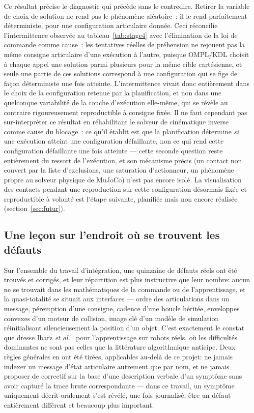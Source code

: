 \documentclass[a4paper, oneside]{article}
\begin{document}
Ce résultat précise le diagnostic qui précède sans le contredire. Retirer la
variable de choix de solution ne rend pas le phénomène aléatoire~: il le rend
parfaitement déterministe, pour une configuration articulaire donnée. Ceci
réconcilie l'intermittence observée au tableau~\ref{tab:stage4} avec
l'élimination de la loi de commande comme cause~: les tentatives réelles de
préhension ne rejouent pas la même consigne articulaire d'une exécution à
l'autre, puisque OMPL/KDL choisit à chaque appel une solution parmi
plusieurs pour la même cible cartésienne, et seule une partie de ces
solutions correspond à une configuration qui se fige de façon déterministe
une fois atteinte. L'intermittence vivait donc entièrement dans le choix de
la configuration retenue par la planification, et non dans une quelconque
variabilité de la couche d'exécution elle-même, qui se révèle au contraire
rigoureusement reproductible à consigne fixée. Il ne faut cependant pas
sur-interpréter ce résultat en réhabilitant le solveur de cinématique inverse
comme cause du blocage~: ce qu'il établit est que la planification détermine
\emph{si} une exécution atteint une configuration défaillante, non ce qui
rend cette configuration défaillante une fois atteinte — cette seconde
question reste entièrement du ressort de l'exécution, et son mécanisme précis
(un contact non couvert par la liste d'exclusions, une saturation
d'actionneur, un phénomène propre au solveur physique de MuJoCo) n'est pas
encore isolé. La visualisation des contacts pendant une reproduction sur
cette configuration désormais fixée et reproductible à volonté est l'étape
suivante, planifiée mais non encore réalisée (section~\ref{sec:futur}).

\subsection{Une leçon sur l'endroit où se trouvent les défauts}

Sur l'ensemble du travail d'intégration, une quinzaine de défauts réels ont été
trouvés et corrigés, et leur répartition est plus instructive que leur nombre:
aucun ne se trouvait dans les mathématiques de la commande ou de
l'apprentissage, et la quasi-totalité se situait aux interfaces — ordre des
articulations dans un message, péremption d'une consigne, cadence d'une boucle
héritée, enveloppes convexes d'un moteur de collision, image clé d'un modèle de
simulation réinitialisant silencieusement la position d'un objet. C'est
exactement le constat que dresse Ibarz \emph{et al.}~\cite{ibarz2021} pour
l'apprentissage sur robots réels, où les difficultés dominantes ne sont pas
celles que la littérature algorithmique anticipe. Deux règles générales en ont
été tirées, applicables au-delà de ce projet: ne jamais indexer un message
d'état articulaire autrement que par nom, et ne jamais proposer de correctif sur
la base d'une description verbale d'un symptôme sans avoir capturé la trace
brute correspondante — dans ce travail, un symptôme uniquement décrit oralement
s'est révélé, une fois journalisé, être un défaut entièrement différent et
beaucoup plus important.
\end{document}
